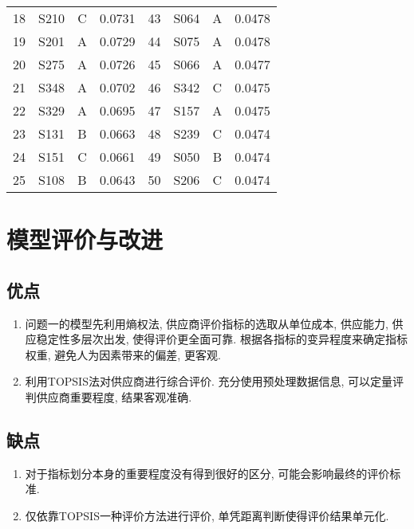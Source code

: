 \documentclass[11pt, fontset = windows]{article}
\begin{document}
\begin{center}
\begin{longtable}{cccc||cccc}
        18 & S210  & C    & 0.0731 & 43 & S064  & A    & 0.0478 \\
        19 & S201  & A    & 0.0729 & 44 & S075  & A    & 0.0478 \\
        20 & S275  & A    & 0.0726 & 45 & S066  & A    & 0.0477 \\
        21 & S348  & A    & 0.0702 & 46 & S342  & C    & 0.0475 \\
        22 & S329  & A    & 0.0695 & 47 & S157  & A    & 0.0475 \\
        23 & S131  & B    & 0.0663 & 48 & S239  & C    & 0.0474 \\
        24 & S151  & C    & 0.0661 & 49 & S050  & B    & 0.0474 \\
        25 & S108  & B    & 0.0643 & 50 & S206  & C    & 0.0474 \\ \bottomrule
    \end{longtable}
\end{center}

\section[]{模型评价与改进}

\subsection[]{优点}

\begin{enumerate}

    \item 问题一的模型先利用熵权法, 供应商评价指标的选取从单位成本, 供应能力, 供应稳定性多层次出发, 使得评价更全面可靠. 根据各指标的变异程度来确定指标权重, 避免人为因素带来的偏差, 更客观.

    \item 利用TOPSIS法对供应商进行综合评价. 充分使用预处理数据信息, 可以定量评判供应商重要程度, 结果客观准确.

\end{enumerate}

\subsection[]{缺点}

\begin{enumerate}

    \item 对于指标划分本身的重要程度没有得到很好的区分, 可能会影响最终的评价标准.

    \item 仅依靠TOPSIS一种评价方法进行评价, 单凭距离判断使得评价结果单元化.

\end{enumerate}
\end{document}
